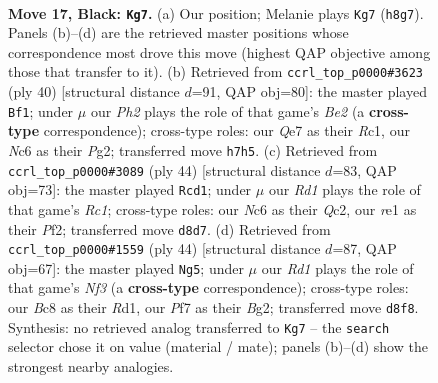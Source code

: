 \documentclass[11pt]{article}
\begin{document}
\clearpage

\begin{figure}[p]\centering
\begin{subfigure}{0.46\textwidth}\centering
\resizebox{\linewidth}{!}{%
\newchessgame
\chessboard[
  setfen={2br3k/1p2qp1p/r1nb1np1/p5Q1/P3P3/1P3NP1/1B3PBP/RN2R1K1 b - - 2 17},
  showmover=false,
  pgfstyle=straightmove, color=movearrow, markmove={h8-g7}
]}
\caption{}
\end{subfigure}\hfill
\begin{subfigure}{0.46\textwidth}\centering
\resizebox{\linewidth}{!}{%
\newchessgame
\chessboard[
  setfen={r2r2k1/1b2npp1/pp2p1np/4q3/QP1N4/P1N1P2P/4BPP1/2RR2K1 w - - 1 21},
  showmover=false,
  pgfstyle=straightmove, color=movearrow, markmove={e2-f1}
]}
\caption{}
\end{subfigure}
\\[4pt]
\begin{subfigure}{0.46\textwidth}\centering
\resizebox{\linewidth}{!}{%
\newchessgame
\chessboard[
  setfen={b1r1r1k1/3n1pp1/p4n1p/q2pb3/2pN3B/P1N1P2P/1PQRBPP1/2R3K1 w - - 8 23},
  showmover=false,
  pgfstyle=straightmove, color=movearrow, markmove={c1-d1}
]}
\caption{}
\end{subfigure}\hfill
\begin{subfigure}{0.46\textwidth}\centering
\resizebox{\linewidth}{!}{%
\newchessgame
\chessboard[
  setfen={b1r1r1k1/3nbpp1/p2p1n2/qp1P3p/3B4/P1N1PNPP/1Q3PBK/2RR4 w - - 0 23},
  showmover=false,
  pgfstyle=straightmove, color=movearrow, markmove={f3-g5}
]}
\caption{}
\end{subfigure}
\caption{\textbf{Move 17, Black: \texttt{Kg7}.} (a) Our position; Melanie plays \texttt{Kg7} (\texttt{h8g7}). Panels (b)--(d) are the retrieved master positions whose correspondence most drove this move (highest QAP objective among those that transfer to it). (b) Retrieved from \texttt{ccrl\_top\_p0000\#3623} (ply 40) [structural distance $d$=91, QAP obj=80]: the master played \texttt{Bf1}; under $\mu$ our \emph{Ph2} plays the role of that game's \emph{Be2} (a \textbf{cross-type} correspondence); cross-type roles: our \emph{Q}e7 as their \emph{R}c1, our \emph{N}c6 as their \emph{P}g2; transferred move \texttt{h7h5}. (c) Retrieved from \texttt{ccrl\_top\_p0000\#3089} (ply 44) [structural distance $d$=83, QAP obj=73]: the master played \texttt{Rcd1}; under $\mu$ our \emph{Rd1} plays the role of that game's \emph{Rc1}; cross-type roles: our \emph{N}c6 as their \emph{Q}c2, our \emph{r}e1 as their \emph{P}f2; transferred move \texttt{d8d7}. (d) Retrieved from \texttt{ccrl\_top\_p0000\#1559} (ply 44) [structural distance $d$=87, QAP obj=67]: the master played \texttt{Ng5}; under $\mu$ our \emph{Rd1} plays the role of that game's \emph{Nf3} (a \textbf{cross-type} correspondence); cross-type roles: our \emph{B}c8 as their \emph{R}d1, our \emph{P}f7 as their \emph{B}g2; transferred move \texttt{d8f8}. Synthesis: no retrieved analog transferred to \texttt{Kg7} -- the \texttt{search} selector chose it on value (material / mate); panels (b)--(d) show the strongest nearby analogies.}
\label{fig:thought-m33}
\end{figure}
\end{document}
